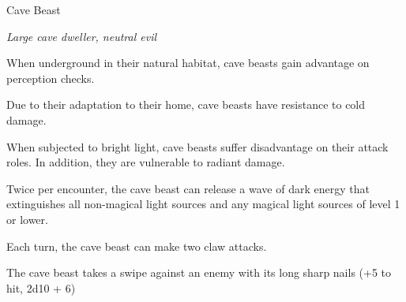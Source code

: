 \documentclass[./main.tex]{subfiles}
\begin{document}
\begin{monsterbox}{Cave Beast}\label{monster:foo}
  \begin{hangingpar}
    \textit{Large cave dweller, neutral evil}
  \end{hangingpar}
	\dndline%
	\basics[%
	armorclass = 14,
	hitpoints  = \dice{8d12 + 10},
	speed      = 30 ft
	]
	\dndline%
	\stats[
    STR = \stat{18}, %
    DEX = \stat{12},
    INT = \stat{8},
    CON = \stat{12},
    WIS = \stat{8},
    CHA = \stat{2}
	]
	\dndline%
	\details[%
	languages = {Deep Speech}, 
 	senses = Blindsight 30 ft., challenge = 4,
 	skills = Perception (+6),
	]
	\dndline%
	\begin{monsteraction}
	    When underground in their natural habitat, cave beasts gain advantage on perception checks.
	\end{monsteraction}
	\begin{monsteraction}
	    Due to their adaptation to their home, cave beasts have resistance to cold damage.
	\end{monsteraction}
	\begin{monsteraction}
	    When subjected to bright light, cave beasts suffer disadvantage on their attack roles. In addition, they are vulnerable to radiant damage.
	\end{monsteraction}
	\begin{monsteraction}
        Twice per encounter, the cave beast can release a wave of dark energy that extinguishes all non-magical light sources and any magical light sources of level 1 or lower.
	\end{monsteraction}
	\begin{monsteraction}
		Each turn, the cave beast can make two claw attacks.
	\end{monsteraction}
	\begin{monsteraction}
	    The cave beast takes a swipe against an enemy with its long sharp nails (+5 to hit, 2d10 + 6)
	\end{monsteraction}
\end{monsterbox}
\end{document}

